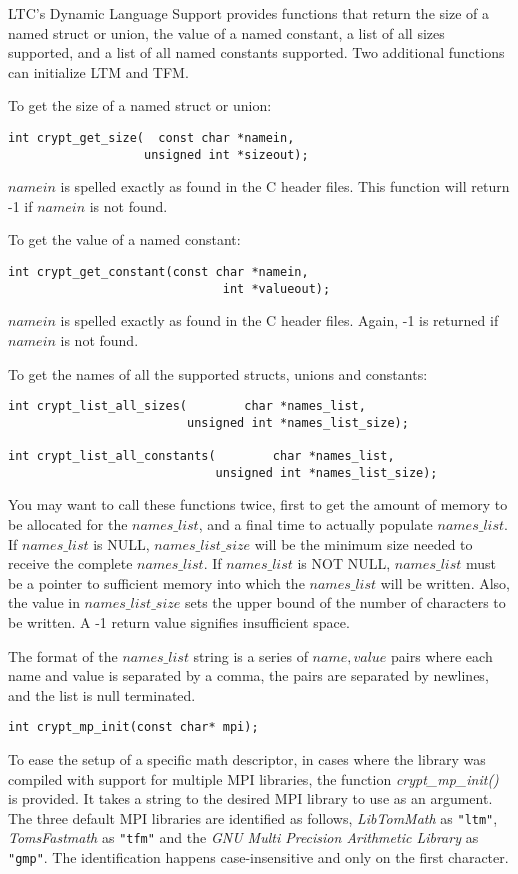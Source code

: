 \documentclass[synpaper]{book}
\begin{document}
LTC's Dynamic Language Support provides functions that return the size of
a named struct or union, the value of a named constant, a list of all sizes
supported, and a list of all named constants supported.  Two additional
functions can initialize LTM and TFM.

To get the size of a named struct or union:
\begin{verbatim}
int crypt_get_size(  const char *namein,
                   unsigned int *sizeout);
\end{verbatim}
$namein$ is spelled exactly as found in the C header files.  This function will
return -1 if $namein$ is not found.

To get the value of a named constant:
\begin{verbatim}
int crypt_get_constant(const char *namein,
                              int *valueout);
\end{verbatim}
$namein$ is spelled exactly as found in the C header files.  Again, -1 is
returned if $namein$ is not found.

To get the names of all the supported structs, unions and constants:
\begin{verbatim}
int crypt_list_all_sizes(        char *names_list,
                         unsigned int *names_list_size);

int crypt_list_all_constants(        char *names_list,
                             unsigned int *names_list_size);
\end{verbatim}
You may want to call these functions twice, first to get the amount
of memory to be allocated for the $names\_list$, and a final time to
actually populate $names\_list$.  If $names\_list$ is NULL,
$names\_list\_size$ will be the minimum size needed to receive the
complete $names\_list$.  If $names\_list$ is NOT NULL, $names\_list$ must
be a pointer to sufficient memory into which the $names\_list$ will be
written.  Also, the value in $names\_list\_size$ sets the upper bound of
the number of characters to be written.  A -1 return value signifies
insufficient space.

The format of the $names\_list$ string is a series of $name,value$ pairs
where each name and value is separated by a comma, the pairs are separated
by newlines, and the list is null terminated.

\begin{verbatim}
int crypt_mp_init(const char* mpi);
\end{verbatim}

To ease the setup of a specific math descriptor, in cases where the library was compiled with support for multiple MPI libraries,
the function \textit{crypt\_mp\_init()} is provided.
It takes a string to the desired MPI library to use as an argument.
The three default MPI libraries are identified as follows, \textit{LibTomMath} as \texttt{"ltm"}, \textit{TomsFastmath} as \texttt{"tfm"}
and the \textit{GNU Multi Precision Arithmetic Library} as \texttt{"gmp"}.
The identification happens case-insensitive and only on the first character.
\end{document}
